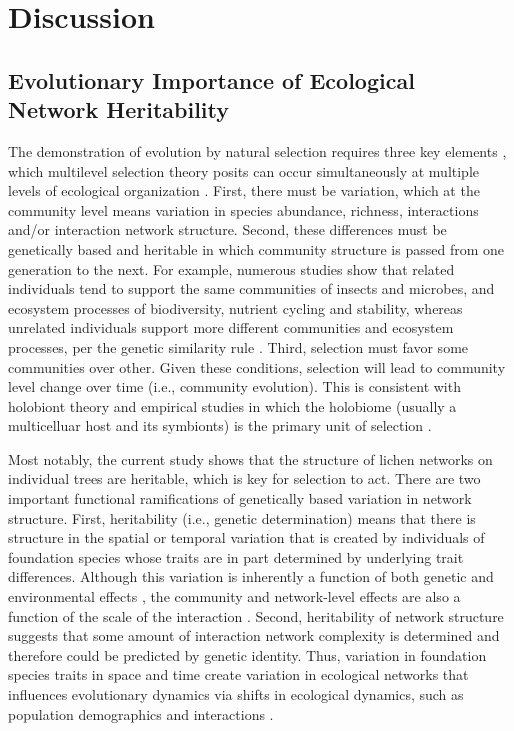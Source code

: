 \documentclass[fleqn,12pt]{olplainarticle}
\begin{document}
\section*{Discussion}


\subsection*{Evolutionary Importance of Ecological Network Heritability}

The demonstration of evolution by natural selection requires three key
elements \citep{Conner2004ATextbook}, which multilevel selection
theory posits can occur simultaneously at multiple levels of
ecological organization \citep{Whitham2003,
  Whitham2020IntraspecificEvolution}. First, there must be variation,
which at the community level means variation in species abundance,
richness, interactions and/or interaction network structure. Second,
these differences must be genetically based and heritable in which
community structure is passed from one generation to the next. For
example, numerous studies show that related individuals tend to
support the same communities of insects and microbes, and ecosystem
processes of biodiversity, nutrient cycling and stability, whereas
unrelated individuals support more different communities and ecosystem
processes, per the genetic similarity rule \citep{Bangert2006,
  Bangert2008a, Barbour2009c,
  Whitham2020IntraspecificEvolution}. Third, selection must favor some
communities over other. Given these conditions, selection will lead to
community level change over time (i.e., community evolution). This is
consistent with holobiont theory and empirical studies
\citep{Zilber-Rosenberg2008, Gilbert2012} in which the holobiome
(usually a multicelluar host and its symbionts) is the primary unit of
selection \citep{Bordenstein2015, Johnson2021}.

Most notably, the current study shows that the structure of lichen
networks on individual trees are heritable, which is key for selection
to act. There are two important functional ramifications of
genetically based variation in network structure. First, heritability
(i.e., genetic determination) means that there is structure in the
spatial or temporal variation that is created by individuals of
foundation species whose traits are in part determined by underlying
trait differences. Although this variation is inherently a function of
both genetic and environmental effects \citep{Conner2004ATextbook},
the community and network-level effects are also a function of the
scale of the interaction \citep{Shuster2006COMMUNITYSTRUCTURE-fix,
  Lau2017a}. Second, heritability of network structure suggests that
some amount of interaction network complexity is determined and
therefore could be predicted by genetic identity. Thus, variation in
foundation species traits in space and time create variation in
ecological networks that influences evolutionary dynamics via shifts
in ecological dynamics, such as population demographics and
interactions \citep{Guimaraes2020afix}.
\end{document}
